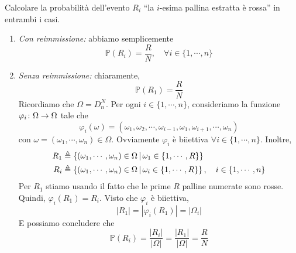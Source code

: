 \documentclass[a4paper]{article}
\begin{document}
\begin{snippetexercise}{}
    Calcolare la probabilità
    dell'evento \(R_i\) ``la \(i\)-esima pallina estratta è rossa''
    in entrambi i casi.
\end{snippetexercise}

\begin{snippetsolution}{}
    \begin{enumerate}
        \item \emph{Con reimmissione:}
            abbiamo semplicemente
            \[
                \mathbb P(R_i) = \frac RN, \quad \forall i \in \{1, \cdots, n\}
            \]
        \item \emph{Senza reimmissione:} chiaramente,
            \[
                \mathbb P(R_1) = \frac RN
            \]
            Ricordiamo che \(\Omega = D_n^N\).
            Per ogni \(i\in \{1, \cdots, n\}\),
            consideriamo la funzione \(\varphi_i \colon \Omega \to \Omega\) tale che
            \[
                \varphi_i(\omega) = (\omega_1, \omega_2, \cdots, \omega_{i-1}, \omega_1, \omega_{i+1}, \cdots, \omega_n)
            \]
            con \(\omega = (\omega_1, \cdots, \omega_n) \in \Omega\).
            Ovviamente \(\varphi_i\) è biiettiva \(\forall i \in \{1, \cdots, n\}\).
            Inoltre,
            \begin{align*}
                R_1 &\triangleq \left\{
                    (\omega_1, \cdots, \omega_n) \in \Omega \,|\, \omega_1 \in \{1, \cdots, R\}
                \right\} \\
                R_i &\triangleq \left\{
                    (\omega_1, \cdots, \omega_n) \in \Omega \,|\, \omega_i \in \{1, \cdots, R\}
                \right\}, \quad i \in \{1, \cdots, n\}
            \end{align*}
            Per \(R_1\) stiamo usando il fatto che le prime \(R\) palline numerate sono rosse.
            Quindi, \(\varphi_i(R_1) = R_i\).
            Visto che \(\varphi_i\) è biiettiva,
            \[
                |R_1| = |\varphi_i(R_1)| = |\Omega_i|
            \]
            E possiamo concludere che
            \[
                \mathbb P(R_i) = \frac{|R_i|}{|\Omega|} = \frac{|R_1|}{|\Omega|} = \frac RN
            \]
    \end{enumerate}
\end{snippetsolution}
\end{document}
